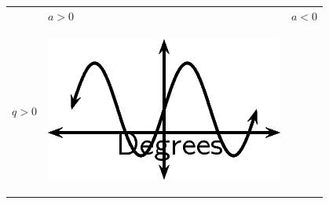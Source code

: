\setlength\mytablespace{6\tabcolsep}
\addtolength\mytablespace{4\arrayrulewidth}
\setlength\mytablewidth{\linewidth}
\setlength\mytableroom{\mytablewidth}
\addtolength\mytableroom{-\mytablespace}
\setlength\myfixedwidth{0pt}
\setlength\mystarwidth{\mytableroom}
\addtolength\mystarwidth{-\myfixedwidth}
\divide{}
\begin{center}
\label{m39414*uid46}
\noindent
{}
\tablelasttail{}
\begin{xtabular*}{\mytablewidth}[t]{|p{10\mystarwidth}|p{10\mystarwidth}|p{10\mystarwidth}|}\hline
&
    $a>0$
    &
    $a<0$
\tabularnewline{}
    $q>0$
    &
\setcounter{subfigure}{0}
\label{m39414*id85372}
\begin{center}
\label{m39414*id85372!!!underscore!!!media}\label{m39414*id85372!!!underscore!!!printimage}\includegraphics{col11306.imgs/m39414_MG10C15_019.png} %

\end{center}
\end{xtabular*}
\end{center}
